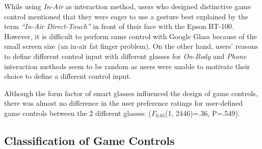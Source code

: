 \documentclass{sigchi}
\begin{document}
  While using \emph{In-Air} as interaction method, users who designed distinctive game control mentioned that they were eager to use a gesture best explained by the term \emph{``In-Air Direct-Touch''} in front of their face with the Epson BT-100. However, it is difficult to perform same control with Google Glass because of the small screen size (an in-air fat finger problem). On the other hand, users' reasons to define different control input with different glasses for \emph{On-Body} and \emph{Phone} interaction methods seem to be random as users were unable to motivate their choice to define a different control input.

  Although the form factor of smart glasses influenced the design of game controls, there was almost no difference in the user preference ratings for user-defined game controls between the 2 different glasses: ($F_{0.05}$(1, 2446)=.36, P=.549).


  \subsection{Classification of Game Controls}
\end{document}
